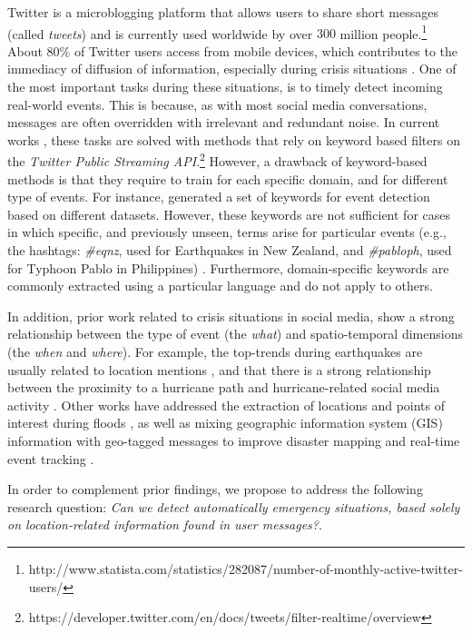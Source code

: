 \documentclass[sigconf]{acmart}
\begin{document}
Twitter is a microblogging platform that allows users to share short messages (called \textit{tweets}) and is currently used worldwide by over $300$ million people.\footnote{http://www.statista.com/statistics/282087/number-of-monthly-active-twitter-users/} About $80\%$ of Twitter users access from mobile devices, which contributes to the immediacy of diffusion of information, especially during crisis situations \cite{castillo2016big}. One of the most important tasks during these situations, is to timely detect incoming real-world events. This is because, as with most social media conversations, messages are often overridden with irrelevant and redundant noise. In current works \cite{kumar2011tweettracker,caragea2011classifying,imranaidr2014,maldonado2017}, these tasks are solved with methods that rely on keyword based filters on the \textit{Twitter Public Streaming API}.\footnote{https://developer.twitter.com/en/docs/tweets/filter-realtime/overview} However, a drawback of keyword-based methods is that they require to train for each specific domain, and for different type of events. For instance, \citeauthor{olteanu2014} \cite{olteanu2014} generated a set of keywords for event detection based on different datasets. However, these keywords are not sufficient for cases in which specific, and previously unseen, terms arise for particular events (e.g., the hashtags: \textit{\#eqnz}, used for Earthquakes in New Zealand, and \textit{\#pabloph}, used for Typhoon Pablo in Philippines) \cite{potts2011tweeting,bruns2012local,karimi2013classifying}. Furthermore, domain-specific keywords are commonly extracted using a particular language and do not apply to others.

In addition, prior work related to crisis situations in social media, show a strong relationship between the type of event (the {\em what}) and spatio-temporal dimensions (the {\em when} and {\em where}). For example, the top-trends during earthquakes are usually related to location mentions \cite{mendoza2010twitter}, and that there is a strong relationship between the proximity to a hurricane path and hurricane-related social media activity \cite{kryvasheyeu2016rapid}. Other works have addressed the extraction of locations and points of interest during floods \cite{lingad2013location}, as well as mixing geographic information system (GIS) information with geo-tagged messages to improve disaster mapping and real-time event tracking \cite{huang2015disastermapper}.

In order to complement prior findings, we propose to address the following research question: \textit{Can we detect automatically emergency situations, based solely on location-related information found in user messages?}.
\end{document}
